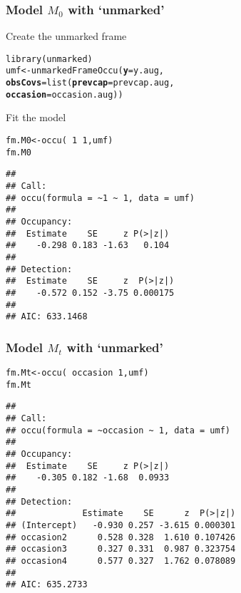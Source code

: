 \documentclass[color=usenames,dvipsnames]{beamer}\usepackage[]{graphicx}\usepackage[]{color}
\makeatletter
\newcommand{\hlnum}[1]{\textcolor[rgb]{0.69,0.494,0}{#1}}%
\newcommand{\hlopt}[1]{\textcolor[rgb]{0,0,0}{#1}}%
\newcommand{\hlstd}[1]{\textcolor[rgb]{0,0,0}{#1}}%
\newcommand{\hlkwb}[1]{\textcolor[rgb]{0,0.341,0.682}{#1}}%
\newcommand{\hlkwc}[1]{\textcolor[rgb]{0,0,0}{\textbf{#1}}}%
\newcommand{\hlkwd}[1]{\textcolor[rgb]{0.004,0.004,0.506}{#1}}%
\newenvironment{kframe}{%
 \def\at@end@of@kframe{}%
 \ifinner\ifhmode%
  \def\at@end@of@kframe{\end{minipage}}%
  \begin{minipage}{\columnwidth}%
 \fi\fi%
 \def\FrameCommand##1{\hskip\@totalleftmargin \hskip-\fboxsep
 \colorbox{shadecolor}{##1}\hskip-\fboxsep
     \hskip-\linewidth \hskip-\@totalleftmargin \hskip\columnwidth}%
 \MakeFramed {\advance\hsize-\width
   \@totalleftmargin\z@ \linewidth\hsize
   \@setminipage}}%
 {\par\unskip\endMakeFramed%
 \at@end@of@kframe}
\newenvironment{knitrout}{}{} %
\makeatother
\begin{document}
\begin{frame}[fragile]
  \frametitle{Model $M_0$ with `unmarked'}
  \small
  Create the unmarked frame
\begin{knitrout}\scriptsize
{}\color{fgcolor}\begin{kframe}
\begin{alltt}
\hlkwd{library}\hlstd{(unmarked)}
\hlstd{umf} \hlkwb{<-} \hlkwd{unmarkedFrameOccu}\hlstd{(}\hlkwc{y}\hlstd{=y.aug,}
                         \hlkwc{obsCovs}\hlstd{=}\hlkwd{list}\hlstd{(}\hlkwc{prevcap}\hlstd{=prevcap.aug,}
                                      \hlkwc{occasion}\hlstd{=occasion.aug))}
\end{alltt}
\end{kframe}
\end{knitrout}
  Fit the model  
\begin{knitrout}\scriptsize
{}\color{fgcolor}\begin{kframe}
\begin{alltt}
\hlstd{fm.M0} \hlkwb{<-} \hlkwd{occu}\hlstd{(}\hlopt{~}\hlnum{1}\hlopt{~}\hlnum{1}\hlstd{, umf)}
\hlstd{fm.M0}
\end{alltt}
\begin{verbatim}
## 
## Call:
## occu(formula = ~1 ~ 1, data = umf)
## 
## Occupancy:
##  Estimate    SE     z P(>|z|)
##    -0.298 0.183 -1.63   0.104
## 
## Detection:
##  Estimate    SE     z  P(>|z|)
##    -0.572 0.152 -3.75 0.000175
## 
## AIC: 633.1468
\end{verbatim}
\end{kframe}
\end{knitrout}
\end{frame}



\begin{frame}[fragile]
  \frametitle{Model $M_t$ with `unmarked'}
\begin{knitrout}\scriptsize
{}\color{fgcolor}\begin{kframe}
\begin{alltt}
\hlstd{fm.Mt} \hlkwb{<-} \hlkwd{occu}\hlstd{(}\hlopt{~}\hlstd{occasion}\hlopt{~}\hlnum{1}\hlstd{, umf)}
\hlstd{fm.Mt}
\end{alltt}
\begin{verbatim}
## 
## Call:
## occu(formula = ~occasion ~ 1, data = umf)
## 
## Occupancy:
##  Estimate    SE     z P(>|z|)
##    -0.305 0.182 -1.68  0.0933
## 
## Detection:
##             Estimate    SE      z  P(>|z|)
## (Intercept)   -0.930 0.257 -3.615 0.000301
## occasion2      0.528 0.328  1.610 0.107426
## occasion3      0.327 0.331  0.987 0.323754
## occasion4      0.577 0.327  1.762 0.078089
## 
## AIC: 635.2733
\end{verbatim}
\end{kframe}
\end{knitrout}
\end{frame}
\end{document}
